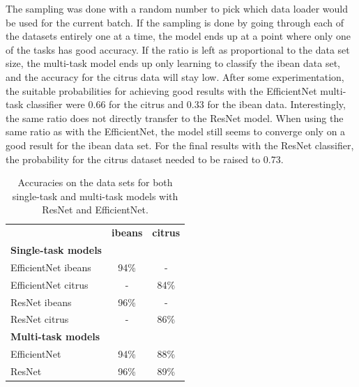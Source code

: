 The sampling was done with a random number to pick which data loader would be used for the current batch.
If the sampling is done by going through each of the datasets entirely one at a time, the model ends up at a point where only one of the tasks has good accuracy.
If the ratio is left as proportional to the data set size, the multi-task model ends up only learning to classify the ibean data set, and the accuracy for the citrus data will stay low.
After some experimentation, the suitable probabilities for achieving good results with the EfficientNet multi-task classifier were 0.66 for the citrus and 0.33 for the ibean data.
Interestingly, the same ratio does not directly transfer to the ResNet model.
When using the same ratio as with the EfficientNet, the model still seems to converge only on a good result for the ibean data set.
For the final results with the ResNet classifier, the probability for the citrus dataset needed to be raised to 0.73.

\begin{table}[]
    \centering
    \begin{tabular}{lcc}
        \multicolumn{1}{l}{\textbf{}}           & \multicolumn{1}{l}{\textbf{ibeans}} & \multicolumn{1}{l}{\textbf{citrus}} \\ \cline{2-3}
        \textbf{Single-task models}             & \multicolumn{1}{l}{}                & \multicolumn{1}{l}{}                \\ \hline
        \multicolumn{1}{l}{EfficientNet ibeans} & \multicolumn{1}{c}{94\%}            & \multicolumn{1}{c}{-}               \\ \hline
        \multicolumn{1}{l}{EfficientNet citrus} & \multicolumn{1}{c}{-}               & \multicolumn{1}{c}{84\%}            \\ \hline
        \multicolumn{1}{l}{ResNet ibeans}       & \multicolumn{1}{c}{96\%}            & \multicolumn{1}{c}{-}               \\ \hline
        \multicolumn{1}{l}{ResNet citrus}       & \multicolumn{1}{c}{-}               & \multicolumn{1}{c}{86\%}            \\ \hline
        \textbf{Multi-task models}              & \multicolumn{1}{l}{}                & \multicolumn{1}{l}{}                \\ \hline
        \multicolumn{1}{l}{EfficientNet}        & \multicolumn{1}{c}{94\%}            & \multicolumn{1}{c}{88\%}            \\ \hline
        \multicolumn{1}{l}{ResNet}              & \multicolumn{1}{c}{96\%}            & \multicolumn{1}{c}{89\%}            \\ \hline
    \end{tabular}
    \caption{Accuracies on the data sets for both single-task and multi-task models with ResNet and EfficientNet.}
\end{table}


